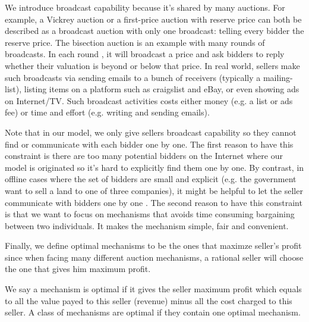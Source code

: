 We introduce broadcast capability because it's shared by many auctions.  For
example, a Vickrey auction or a first-price auction with reserve price can both be
described as a broadcast auction with only one broadcast: telling every bidder
the reserve price. The bisection auction \cite{Herings2009:BisectionAuction} is an
example with many rounds of broadcasts. In each round , it will broadcast
a price and ask bidders to reply whether their valuation is beyond or below that
price.  In real world, sellers make such broadcasts via sending emails to a
bunch of receivers (typically a mailing-list), listing items on a platform such
as craigslist and eBay, or even showing ads on Internet/TV. Such broadcast
activities costs either money (e.g. a list or ads fee) or time and effort (e.g.
writing and sending emails).

Note that in our model, we only give sellers broadcast capability so they
cannot find or communicate with each bidder one by one. The first reason to
have this constraint is there are too many potential bidders on the Internet
where our model is originated so it's hard to explicitly find
them one by one. By contrast, in offline cases where the set of bidders
are small and explicit (e.g. the government want to sell a land to one of three
companies), it might be helpful to let the seller communicate with bidders one
by one \cite{McAfee88:SearchMechanisms}. The second reason to have this constraint is
that we want to focus on mechanisms that avoids time consuming bargaining
between two individuals. It makes the mechanism simple, fair and convenient.

Finally, we define optimal mechanisms to be the ones that maximze seller's
profit since when facing many different auction mechanisms, a rational seller
will choose the one that gives him maximum profit.

\begin{definition}

We say a mechanism is optimal if it gives the seller maximum profit
which equals to all the value payed to this seller (revenue) minus all the cost charged
to this seller. A class of mechanisms are optimal if they contain one optimal
mechanism.

\end{definition}
